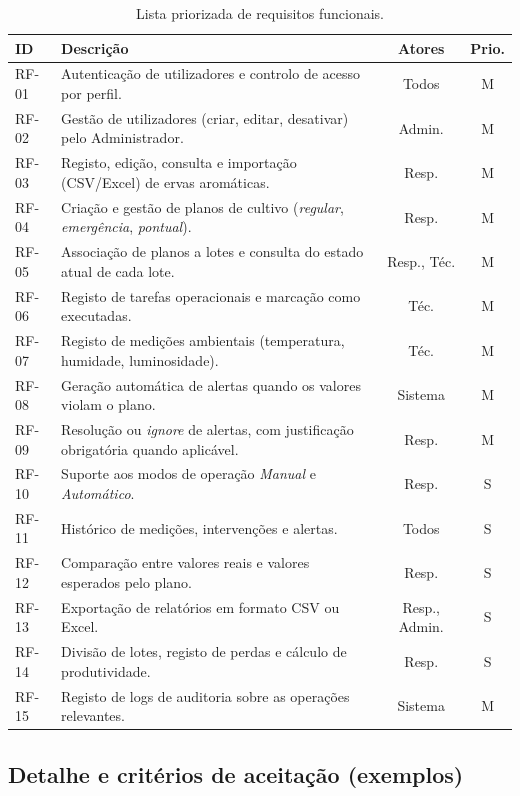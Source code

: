 \begin{table}[H]
\centering
\caption{Lista priorizada de requisitos funcionais.}
\label{tab:rf}
\small
\renewcommand{\arraystretch}{1.3}
\begin{tabularx}{\linewidth}{l X c c}
\toprule
\textbf{ID} & \textbf{Descrição} & \textbf{Atores} & \textbf{Prio.} \\
\midrule
RF-01 & Autenticação de utilizadores e controlo de acesso por perfil. & Todos & M \\
RF-02 & Gestão de utilizadores (criar, editar, desativar) pelo Administrador. & Admin. & M \\
RF-03 & Registo, edição, consulta e importação (CSV/Excel) de ervas aromáticas. & Resp. & M \\
RF-04 & Criação e gestão de planos de cultivo (\emph{regular}, \emph{emergência}, \emph{pontual}). & Resp. & M \\
RF-05 & Associação de planos a lotes e consulta do estado atual de cada lote. & Resp., Téc. & M \\
RF-06 & Registo de tarefas operacionais e marcação como executadas. & Téc. & M \\
RF-07 & Registo de medições ambientais (temperatura, humidade, luminosidade). & Téc. & M \\
RF-08 & Geração automática de alertas quando os valores violam o plano. & Sistema & M \\
RF-09 & Resolução ou \emph{ignore} de alertas, com justificação obrigatória quando aplicável. & Resp. & M \\
RF-10 & Suporte aos modos de operação \emph{Manual} e \emph{Automático}. & Resp. & S \\
RF-11 & Histórico de medições, intervenções e alertas. & Todos & S \\
RF-12 & Comparação entre valores reais e valores esperados pelo plano. & Resp. & S \\
RF-13 & Exportação de relatórios em formato CSV ou Excel. & Resp., Admin. & S \\
RF-14 & Divisão de lotes, registo de perdas e cálculo de produtividade. & Resp. & S \\
RF-15 & Registo de logs de auditoria sobre as operações relevantes. & Sistema & M \\
\bottomrule
\end{tabularx}
\end{table}


\subsection{Detalhe e critérios de aceitação (exemplos)}
\label{sec:rf-detalhe}

